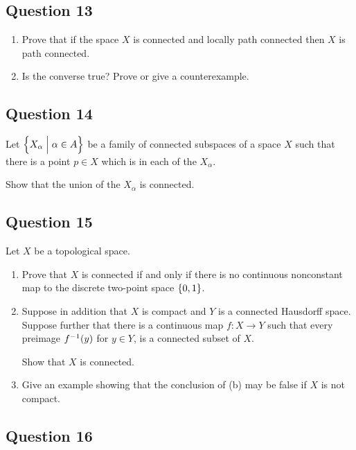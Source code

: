 \documentclass[12pt]{article}
\begin{document}
\hypertarget{question-13-3}{%
\subsection{Question 13}\label{question-13-3}}

\begin{enumerate}
\def\labelenumi{\alph{enumi}.}
\item
  Prove that if the space \(X\) is connected and locally path connected
  then \(X\) is path connected.
\item
  Is the converse true? Prove or give a counterexample.
\end{enumerate}

\hypertarget{question-14-3}{%
\subsection{Question 14}\label{question-14-3}}

Let \(\left\{{X_\alpha \mathrel{\Big|} \alpha \in A}\right\}\) be a family of connected
subspaces of a space \(X\) such that there is a point \(p \in X\) which
is in each of the \(X_\alpha\).

Show that the union of the \(X_\alpha\) is connected.

\hypertarget{question-15-3}{%
\subsection{Question 15}\label{question-15-3}}

Let \(X\) be a topological space.

\begin{enumerate}
\def\labelenumi{\alph{enumi}.}
\item
  Prove that \(X\) is connected if and only if there is no continuous
  nonconstant map to the discrete two-point space \(\left\{{0, 1}\right\}\).
\item
  Suppose in addition that \(X\) is compact and \(Y\) is a connected
  Hausdorff space. Suppose further that there is a continuous map
  \(f : X \to Y\) such that every preimage \(f^{-1} (y)\) for
  \(y \in Y\), is a connected subset of \(X\).

  Show that \(X\) is connected.
\item
  Give an example showing that the conclusion of (b) may be false if
  \(X\) is not compact.
\end{enumerate}

\hypertarget{question-16-3}{%
\subsection{Question 16}\label{question-16-3}}
\end{document}
